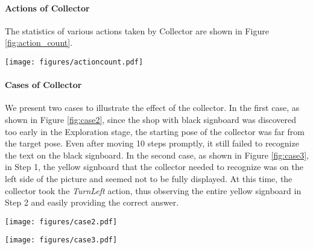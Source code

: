 \paragraph{Actions of Collector}
\label{collector_action}
The statistics of various actions taken by Collector are shown in Figure \ref{fig:action_count}.

\begin{figure*}[!htb]
\centering
    \texttt{[image: figures/actioncount.pdf]}
\caption{The proportion of different actions taken by Collector.}
\label{fig:action_count}
\end{figure*}


\paragraph{Cases of Collector}
\label{a_ablation}

We present two cases to illustrate the effect of the collector. In the first case, as shown in Figure \ref{fig:case2}, since the shop with black signboard was discovered too early in the Exploration stage, the starting pose of the collector was far from the target pose. Even after moving 10 steps promptly, it still failed to recognize the text on the black signboard. In the second case, as shown in Figure \ref{fig:case3}, in Step 1, the yellow signboard that the collector needed to recognize was on the left side of the picture and seemed not to be fully displayed. At this time, the collector took the \textit{TurnLeft} action, thus observing the entire yellow signboard in Step 2 and easily providing the correct answer.


\begin{figure*}[!htb]
\centering
    \texttt{[image: figures/case2.pdf]}
\caption{The failure case for collection.}
\label{fig:case2}
\end{figure*}


\begin{figure*}[!htb]
\centering
    \texttt{[image: figures/case3.pdf]}
\caption{The successful case for collection.}
\label{fig:case3}
\end{figure*}

